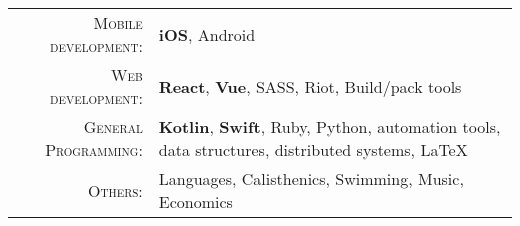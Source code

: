 %
%
%

\begin{tabular}{rl}
    \textsc{Mobile development:} & \textbf{iOS}, Android \\
    \textsc{Web development:} & \textbf{React}, \textbf{Vue}, SASS, Riot, Build/pack tools \\ 
    \textsc{General Programming:} & \textbf{Kotlin}, \textbf{Swift}, Ruby, Python, automation tools, data structures, distributed systems, LaTeX \\ 
    \textsc{Others:} & Languages, Calisthenics, Swimming, Music, Economics \\
\end{tabular}